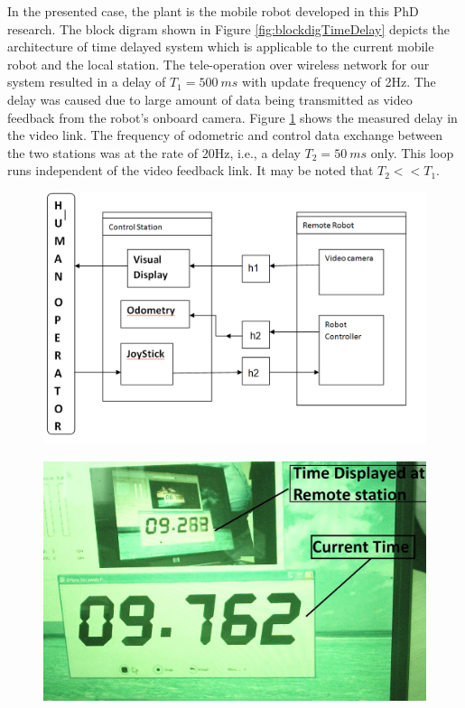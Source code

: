 In the presented case, the plant is the mobile robot developed in this PhD research. The block digram shown in Figure \ref{fig:blockdigTimeDelay} depicts the architecture of time delayed system which is applicable to the current mobile robot and the local station. The tele-operation  over wireless network for our system   resulted in a delay of $T_1= 500~ms$ with update frequency of 2Hz.  The delay was caused due to large amount of data being transmitted as  video feedback from the robot's onboard camera. Figure \ref{fig:delayphoto} shows the measured delay in the video link. The frequency of odometric and control  data exchange between the two stations was at the rate of 20Hz, i.e., a delay $T_2=50~ms$ only. This  loop runs  independent of the video feedback link.  It may be noted that $T_2<<T_1$.
 \begin{figure}[ht]
 	\centering
 	\begin{minipage}{0.55\textwidth}
 		\centering
 		\includegraphics[width=.9\linewidth,keepaspectratio]{Chapter7/fig/BlockTimeDelay}
 		\label{fig:blockdigTimeDelay}
 	\end{minipage}
  	\begin{minipage}{0.40\textwidth}
 	\centering
 	\includegraphics[width=\linewidth,keepaspectratio]{Chapter7/fig/delayMeasureNew}
 	\label{fig:delayphoto}
 \end{minipage}%
 \end{figure} 


